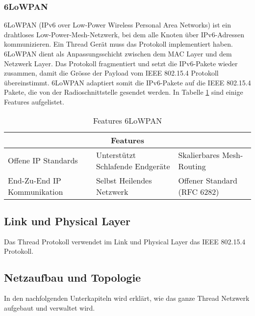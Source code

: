 \subsubsection{6LoWPAN}\label{subsubsec:6LoWPAN}
6LoWPAN (IPv6 over Low-Power Wireless Personal Area Networks) ist ein drahtloses Low-Power-Mesh-Netzwerk, bei dem alle Knoten über IPv6-Adressen kommunizieren. Ein Thread Gerät muss das Protokoll implementiert haben. 6LoWPAN dient als Anpassungsschicht zwischen dem MAC Layer und dem Netzwerk Layer. Das Protokoll fragmentiert und setzt die IPv6-Pakete wieder zusammen, damit die Grösse der Payload vom IEEE 802.15.4 Protokoll übereinstimmt. 6LoWPAN adaptiert somit die IPv6-Pakete auf die IEEE 802.15.4 Pakete, die von der Radioschnittstelle gesendet werden. \cite{thubert_compression_2011} In Tabelle \ref{table:Features6LoWPAN} sind einige Features aufgelistet. \cite[Seite 3-10]{thread_group_inc_thread_2017}
\begin{table}[H]
	\centering
	\begin{adjustbox}{width=1\textwidth}
		\begin{tabular}{@{}|l|l|l|@{}}
			\toprule
			\multicolumn{3}{|c|}{\textbf{Features}}                                                      \\ \midrule
			Offene IP Standards         & Unterstützt Schlafende Endgeräte & Skalierbares Mesh-Routing   \\ \midrule
			End-Zu-End IP Kommunikation & Selbst Heilendes Netzwerk        & Offener Standard (RFC 6282) \\ \bottomrule
		\end{tabular}
	\end{adjustbox}
	\caption{Features 6LoWPAN}
	\label{table:Features6LoWPAN}
\end{table}

\subsection{Link und Physical Layer}\label{subsec:IEE802154}
Das Thread Protokoll verwendet im Link und Physical Layer das IEEE 802.15.4 Protokoll. \cite{ieee_computer_society_ieee_2020} \cite[Seite 3-2]{thread_group_inc_thread_2017}
\newpage

\subsection{Netzaufbau und Topologie}\label{subsec:NetzaufbauTopologie}
In den nachfolgenden Unterkapiteln wird erklärt, wie das ganze Thread Netzwerk aufgebaut und verwaltet wird.

